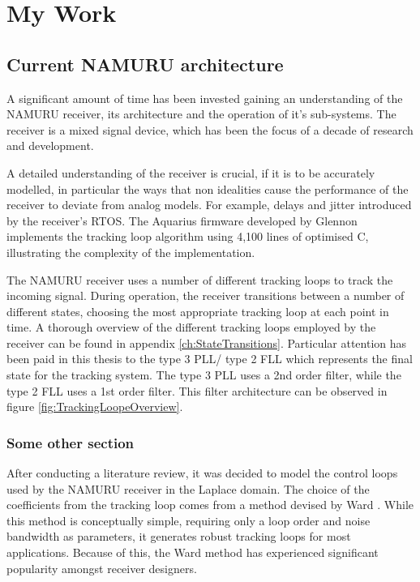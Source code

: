 \chapter{My Work}\label{ch:MyWork}

\section{Current \ac{NAMURU} architecture}
A significant amount of time has been invested gaining an understanding of the \ac{NAMURU} receiver, its architecture and the operation of it's sub-systems. The receiver is a mixed signal device, which has been the focus of a decade of research and development. 

A detailed understanding of the receiver is crucial, if it is to be accurately modelled, in particular the ways that non idealities cause the performance of the receiver to deviate from analog models. For example, delays and jitter introduced  by the receiver's \ac{RTOS}. The Aquarius firmware developed by Glennon \cite{Glennon11aquariusfirmware} implements the tracking loop algorithm using 4,100 lines of optimised C, illustrating the complexity of the implementation.

The \ac{NAMURU} receiver uses a number of different tracking loops to track the incoming signal. During operation, the receiver transitions between a number of different states, choosing the most appropriate tracking loop at each point in time. A thorough overview of the different tracking loops employed by the receiver can be found in appendix \ref{ch:StateTransitions}. Particular attention has been paid in this thesis to the type 3 PLL/ type 2 FLL which represents the final state for the tracking system. The type 3 PLL uses a 2nd order filter, while the type 2 FLL uses a 1st order filter. This filter architecture can be observed in figure \ref{fig:TrackingLoopeOverview}. 



\subsection{Some other section}

After conducting a literature review, it was decided to model the control loops used by the \ac{NAMURU} receiver in the Laplace domain. The choice of the coefficients from the tracking loop comes from a method devised by Ward \cite{Ward}. While this method is conceptually simple, requiring only a loop order and noise bandwidth as parameters, it generates robust tracking loops for most applications. Because of this, the Ward method has experienced significant popularity amongst receiver designers.  

